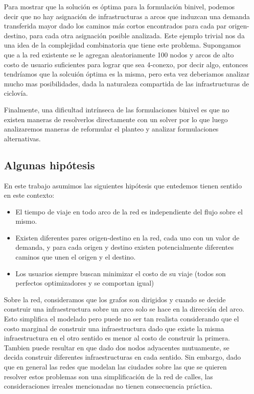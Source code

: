 \documentclass{article}
\begin{document}
  Para mostrar que la solución es óptima para la formulación binivel, podemos decir que no hay asignación de infrastructuras a arcos que induzcan una demanda transferida mayor dado los caminos más cortos encontrados para cada par origen-destino, para cada otra asignación posible analizada.
  Este ejemplo trivial nos da una idea de la complejidad combinatoria que tiene este problema. Supongamos que a la red existente se le agregan aleatoriamente 100 nodos y arcos de alto costo de usuario suficientes para lograr que sea 4-conexo, por decir algo, entonces tendríamos que la solcuión óptima es la misma, pero esta vez deberiamos analizar mucho mas posibilidades, dada la naturaleza compartida de las infrastructuras de ciclovía.

  Finalmente, una dificultad intrínseca de las formulaciones binivel es que no existen maneras de resolverlos directamente con un solver por lo que luego analizaremos maneras de reformular el planteo y analizar formulaciones alternativas.

  \subsection{Algunas hipótesis}

  En este trabajo asumimos las siguientes hipótesis que entedemos tienen sentido en este contexto:

  \begin{itemize}
    \item{El tiempo de viaje en todo arco de la red es independiente del flujo sobre el mismo.}
    \item{Existen diferentes pares origen-destino en la red, cada uno con un valor de demanda, y para cada origen y destino existen potencialmente diferentes caminos que unen el origen y el destino.}
    \item{Los usuarios siempre buscan minimizar el costo de su viaje (todos son
    perfectos optimizadores y se comportan igual)}
  \end{itemize}

  Sobre la red, consideramos que los grafos son dirigidos y cuando se decide construir una infraestructura sobre un arco solo se hace en la dirección del arco. Esto simplifica el modelado pero puede no ser tan realista considerando que el costo marginal de construir una infraestructura dado que existe la misma infraestructura en el otro sentido es menor al costo de construir la primera. Tambien puede resultar en que dado dos nodos adyacentes mutuamente, se decida construir diferentes infraestructuras en cada sentido. Sin embargo, dado que en general las redes que modelan las ciudades sobre las que se quieren resolver estos problemas son una simplificación de la red de calles, las consideraciones irreales mencionadas no tienen consecuencia práctica.
\end{document}
